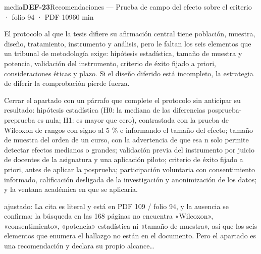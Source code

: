 \begin{ficha}{media}{\casilla\textbf{DEF-23}\quad{}\quad Recomendaciones — Prueba de campo del efecto sobre el criterio · folio 94 · PDF 109\hfill 60 min}
\par
{}El protocolo al que la tesis difiere su afirmación central tiene población, muestra, diseño, tratamiento, instrumento y análisis, pero le faltan los seis elementos que un tribunal de metodología exige: hipótesis estadística, tamaño de muestra y potencia, validación del instrumento, criterio de éxito fijado a priori, consideraciones éticas y plazo. Si el diseño diferido está incompleto, la estrategia de diferir la comprobación pierde fuerza.\par
{}Cerrar el apartado con un párrafo que complete el protocolo sin anticipar su resultado: hipótesis estadística (H0: la mediana de las diferencias posprueba-preprueba es nula; H1: es mayor que cero), contrastada con la prueba de Wilcoxon de rangos con signo al 5 \% e informando el tamaño del efecto; tamaño de muestra del orden de un curso, con la advertencia de que esa n solo permite detectar efectos medianos o grandes; validación previa del instrumento por juicio de docentes de la asignatura y una aplicación piloto; criterio de éxito fijado a priori, antes de aplicar la posprueba; participación voluntaria con consentimiento informado, calificación desligada de la investigación y anonimización de los datos; y la ventana académica en que se aplicaría.\par
{\footnotesize\color{gris}ajustado: La cita es literal y está en PDF 109 /\allowbreak{} folio 94, y la ausencia se confirma: la búsqueda en las 168 páginas no encuentra «Wilcoxon», «consentimiento», «potencia» estadística ni «tamaño de muestra», así que los seis elementos que enumera el hallazgo no están en el documento. Pero el apartado es una recomendación y declara su propio alcance…\par}
\end{ficha}
